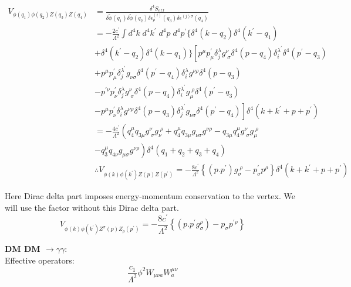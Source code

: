 \documentclass[12pt]{report}
\begin{document}
\begin{align*}
V_{\phi(q_1) \phi(q_2) Z(q_3) Z(q_4)} &=\frac{\delta^4 S_{eff}}{\delta \tilde{\phi}(q_1) \delta \tilde{\phi}(q_2) \delta\epsilon^{(i)}_\rho(q_3) \delta \epsilon^{(j)\sigma}(q_4)}\\
&= -\frac{2c^\prime}{\Lambda^2} \int d^4k\; d^4k^\prime\; d^4p \; d^4p^\prime \{ \delta^4(k-q_2) \delta^4(k^\prime-q_1) \\
&+ \delta^4(k^\prime-q_2) \delta^4(k-q_1) \}
 \left[p^\mu p^\prime_\mu \delta^\lambda_j g^\nu_{\; \sigma} \delta^4(p-q_4) \delta^{\lambda^\prime}_i \delta^4(p^\prime-q_3) \right. \\
 &+ p^\mu p^\prime_\mu \delta^{\lambda^\prime}_j g_{\nu \sigma} \delta^4(p^\prime-q_4) \delta^\lambda_i g^{\nu \rho} \delta^4(p-q_3) \\
 & -p^{\prime \nu} p^\prime_\nu \delta^\lambda_j g^\nu_{\; \sigma} \delta^4(p-q_4) \delta^{\lambda^\prime}_i g_\mu^{\; \rho} \delta^4(p^\prime-q_3) \\
 & \left. - p^\mu p^\prime_\nu \delta^\lambda_i g^{\nu \rho} \delta^4(p-q_3)  \delta^{\lambda^\prime}_j g_{\nu \sigma} \delta^4(p^\prime-q_4) \right] \delta^4(k+k^\prime+p+p^\prime) \\
&= -\frac{4c^\prime}{\Lambda^2} \left(q_4^\mu q_{3\mu} g^\nu_{\; \sigma} g_\nu^{\; \rho} + q_4^\mu q_{3 \mu} g_{\nu \sigma} g^{\nu \rho} -q_{3 \mu} q_4^\mu g^\nu_{\; \sigma} g_\mu^{\; \rho} \right. \\
& \left. -  q_3^\mu q_{4 \nu} g_{\mu \sigma} g^{\nu \rho} \right) \delta^4(q_1+q_2 +q_3+ q_4 )\\
&\therefore  V_{\phi(k) \phi(k^\prime) Z(p) Z(p^\prime)}  = -\frac{8c^\prime}{\Lambda^2} \left\{ (p.p^\prime) g^{\; \rho}_\sigma - p^\prime_\sigma p^{\rho} \right\} \delta^4(k+k^\prime+p+p^\prime)
\end{align*}


Here Dirac delta part imposes energy-momentum conservation to the vertex. We will use the factor without this Dirac delta part. 
\begin{equation}
V_{\phi(k) \phi(k^\prime) Z^\sigma(p) Z_\rho(p^\prime)}  = -\frac{8c^\prime}{\Lambda^2} \left\{ (p.p^\prime g^\rho_{\sigma}) - p_\sigma p^{\prime \rho} \right\} \label{zv}
\end{equation}




\textbf{DM DM $\longrightarrow \gamma \gamma$}:\\

Effective operators: $$\frac{c_1}{\Lambda^2} \phi^2 W_{\mu \nu a} W^{\mu \nu}_a$$
\end{document}
